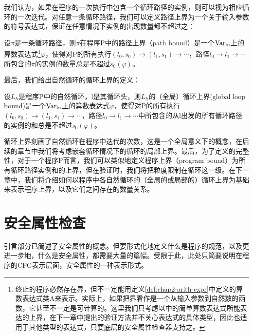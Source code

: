 我们认为，如果在程序的一次执行中包含一个循环路径的实例，则可以视为相应循环的一次迭代。对任意一条循环路径，我们可以定义路径上界为一个关于输入参数的符号表达式，保证在任意情况下实例的出现数量都不超过之：

\begin{definition}
  设$\pi$是一条循环路径，则$\pi$在程序P中的路径上界（path bound）是一个$\operatorname{Var}_{\operatorname{in}}$上的算数表达式\footnote{终止的程序必然存在界，但不一定能用定义\ref{def:chap2-arith-expr}中定义的算数表达式类A来表示。实际上，如果把界看作是一个从输入参数到自然数的函数，它甚至不一定是可计算的。这里我们只考虑以中的简单算数表达式所能表达的上界，在下一章中提出的验证方法并不关心表达式的具体类型，因此也适用于其他类型的表达式，只要底层的安全属性检查器支持之。}$\varphi$，使得对P的所有执行$(l_0,
  s_0) \rightarrow (l_1, s_1) \rightarrow \cdots$，路径$l_0 \rightarrow l_1
  \rightarrow \cdots$所包含的$\pi$的实例的数量总是不超过$s_0
  (\varphi)$。
\end{definition}

最后，我们给出自然循环的循环上界的定义：

\begin{definition}
  \label{def:chap2-loop-bound}
  设$L_h$是程序P中的自然循环，l是其循环头，则$L_h$的（全局）循环上界(global loop bound)是一个$\operatorname{Var}_{\operatorname{in}}$上的算数表达式$\varphi$，使得对P的所有执行$(l_0, s_0) \rightarrow (l_1, s_1) \rightarrow \cdots$，路径$l_0 \rightarrow l_1 \rightarrow \cdots$中所包含的从l出发的所有循环路径的实例的和总是不超过$s_0 (\varphi)$。
\end{definition}

循环上界刻画了自然循环在程序中迭代的次数，这是一个全局意义下的概念，在后续的章节中我们将考虑嵌套循环情况下的循环的局部上界。最后，为了定义的完整性，对于一个程序P而言，我们可以类似地定义程序上界（program
bound）为所有循环路径实例和的上界，但在验证时，我们将把粒度限制在循环这一级。在下一章中，我们将介绍如何以程序中各自然循环的（全局的或局部的）循环上界为基础来表示程序上界，以及它们之间存在的数量关系。

\section{安全属性检查}

\label{section:chap2-safety-check}

引言部分已简述了安全属性的概念。但要形式化地定义什么是程序的规范，以及更进一步地，什么是安全属性，都需要大量的篇幅。受限于此，此处只简要说明在程序的CFG表示层面，安全属性的一种表示形式。

